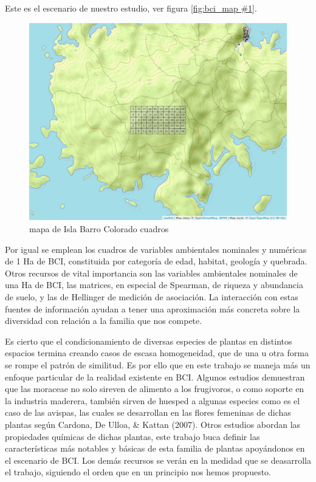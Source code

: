 \documentclass[11pt,]{article}
\begin{document}
Este es el escenario de nuestro estudio, ver figura
\ref{fig:bci_map #1}.

\begin{figure}
\centering
\includegraphics[width=1.00000\textwidth]{mapa_cuadros.png}
\caption{mapa de Isla Barro Colorado cuadros\label{fig:bci_map}}
\end{figure}

Por igual se emplean los cuadros de variables ambientales nominales y
numéricas de 1 Ha de BCI, constituida por categoría de edad, habitat,
geología y quebrada. Otros recursos de vital importancia son las
variables ambientales nominales de una Ha de BCI, las matrices, en
especial de Spearman, de riqueza y abundancia de suelo, y las de
Hellinger de medición de asociación. La interacción con estas fuentes de
información ayudan a tener una aproximación más concreta sobre la
diversidad con relación a la familia que nos compete.

Es cierto que el condicionamiento de diversas especies de plantas en
distintos espacios termina creando casos de escasa homogeneidad, que de
una u otra forma se rompe el patrón de similitud. Es por ello que en
este trabajo se maneja más un enfoque particular de la realidad
existente en BCI. Algunos estudios demuestran que las moraceae no solo
sireven de alimento a los frugivoros, o como soporte en la industria
maderera, también sirven de huesped a algunas especies como es el caso
de las avispas, las cuales se desarrollan en las flores femeninas de
dichas plantas según Cardona, De Ulloa, \& Kattan (2007). Otros estudios
abordan las propiedades químicas de dichas plantas, este trabajo buca
definir las características más notables y básicas de esta familia de
plantas apoyándonos en el escenario de BCI. Los demás recursos se verán
en la medidad que se deasarrolla el trabajo, siguiendo el orden que en
un principio nos hemos propuesto.
\end{document}
